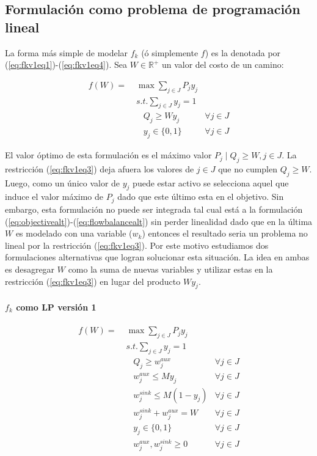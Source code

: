 \FloatBarrier
\subsection{Formulación como problema de programación lineal}

La forma más simple de modelar $f_k$ (ó simplemente $f$) es la denotada por (\ref{eq:fkv1eq1})-(\ref{eq:fkv1eq4}). Sea $W \in \mathbb{R}^+$ un valor del costo de un camino:

\begin{align}
  f(W) =\; & \max \sum_{j \in J} P_j y_j    & \label{eq:fkv1eq1} \\
           & s.t. \sum_{j \in J} y_j = 1   & \label{eq:fkv1eq2} \\
           & \;\;\; Q_j \geq W y_j         & \label{eq:fkv1eq3} \forall j \in J \\
           & \;\;\; y_j \in \{0,1\}        & \label{eq:fkv1eq4} \forall j \in J
\end{align}

El valor óptimo de esta formulación es el máximo valor $P_j \;|\; Q_j \geq W, j \in J$. La restricción (\ref{eq:fkv1eq3}) deja afuera los valores de $j \in J$ que no cumplen $Q_j \geq W$. Luego, como un único valor de $y_j$ puede estar activo se selecciona aquel que induce el valor máximo de $P_j$ dado que este último esta en el objetivo. Sin embargo, esta formulación no puede ser integrada tal cual está a la formulación (\ref{eq:objectivealt})-(\ref{eq:flowbalancealt}) sin perder linealidad dado que en la última $W$ es modelado con una variable ($w_k$) entonces el resultado seria un problema no lineal por la restricción (\ref{eq:fkv1eq3}). Por este motivo estudiamos dos formulaciones alternativas que logran solucionar esta situación. La idea en ambas es desagregar $W$ como la suma de nuevas variables y utilizar estas en la restricción (\ref{eq:fkv1eq3}) en lugar del producto $W y_j$.

\paragraph*{$f_k$ como LP versión 1}

\begin{align}
  f(W) =\; & \max \sum_{j \in J} P_j y_j             & \label{eq:fkv3eq1}\\
           & s.t. \sum_{j \in J} y_j = 1            & \label{eq:fkv3eq2}\\
           & \;\;\; Q_j \geq w^{aux}_j              & \forall j \in J \label{eq:fkv3eq3} \\
           & \;\;\; w^{aux}_j \leq M y_j            & \forall j \in J \label{eq:fkv3eq4} \\
           & \;\;\; w^{sink}_j \leq M (1 - y_j)     & \forall j \in J \label{eq:fkv3eq5} \\
           & \;\;\; w^{sink}_j + w^{aux}_j = W      & \label{eq:fkv3eq6} \forall j \in J\\
           & \;\;\; y_j \in \{0,1\}                 & \label{eq:fkv3domainy} \forall j \in J \\
           & \;\;\; w^{aux}_j, w^{sink}_j \geq 0    & \label{eq:fkv3eq7} \forall j \in J
\end{align}

